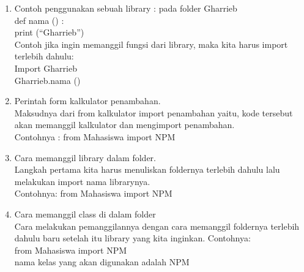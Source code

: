 \begin{enumerate}
	\item Contoh penggunakan sebuah library : pada folder Gharrieb\\
	def  nama () :\\
	print (“Gharrieb”)\\
	Contoh jika ingin memanggil fungsi dari library, maka kita harus import terlebih dahulu:\\
	Import Gharrieb\\
	Gharrieb.nama ()\\
	
	\item Perintah form kalkulator penambahan.\\
	Maksudnya dari from kalkulator import penambahan yaitu, kode tersebut akan memanggil kalkulator dan mengimport penambahan.\\
	Contohnya : from Mahasiswa import NPM\\
	
	\item Cara memanggil library dalam folder.\\
	Langkah pertama kita harus menuliskan foldernya terlebih dahulu lalu melakukan import nama librarynya.\\
    Contohnya: from Mahasiswa import NPM\\ 
	
	\item Cara memanggil class di dalam folder\\
	Cara melakukan pemanggilannya dengan cara memanggil foldernya terlebih dahulu baru setelah itu library yang kita inginkan. Contohnya:\\
	from Mahasiswa import NPM\\
	nama kelas yang akan digunakan adalah NPM\\
	


\end{enumerate}
